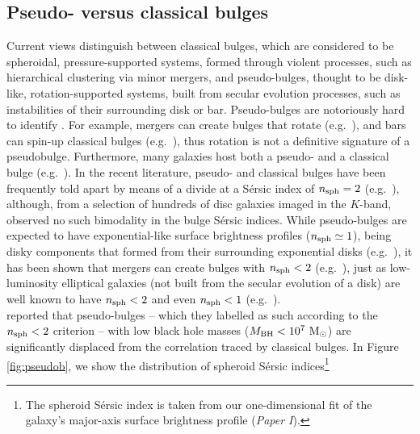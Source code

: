 \documentclass[preprint2]{emulateapj}
\begin{document}
\subsection{Pseudo- versus classical bulges}
Current views distinguish between classical bulges, which are considered to be spheroidal, pressure-supported systems, 
formed through violent processes, such as hierarchical clustering via minor mergers, 
and pseudo-bulges, thought to be disk-like, rotation-supported systems, 
built from secular evolution processes, such as instabilities of their surrounding disk or bar. 
Pseudo-bulges are notoriously hard to identify \citep{graham2013review,graham2014review,graham2015pseudo,graham2015review}.
For example, mergers can create bulges that rotate (e.g.~\citealt{bekki2010,keselmannusser2012}), 
and bars can spin-up classical bulges (e.g.~\citealt{saha2012}), 
thus rotation is not a definitive signature of a pseudobulge. 
Furthermore, many galaxies host both a pseudo- and a classical bulge (e.g.~\citealt{erwin2003,erwin2015,athanassoula2005,Gadotti2009,
macarthur2009,dosanjosdasilva2013,seidel2015}). 
In the recent literature, pseudo- and classical bulges have been frequently told apart by means of a divide at a 
S\'ersic index of $n_{\rm sph}=2$ (e.g.~\citealt{sani2011,beifiori2012}), 
although, from a selection of hundreds of disc galaxies imaged in the $K$-band, 
\cite{grahamworley2008} observed no such bimodality in the bulge S\'ersic indices. 
While pseudo-bulges are expected to have exponential-like surface brightness profiles ($n_{\rm sph} \simeq 1$), 
being disky components that formed from their surrounding exponential disks 
(e.g.~\citealt{bardeen1975,hohl1975,combessanders1981,combes1990,pfennigerfriedli1991}), 
it has been shown that mergers can create bulges with $n_{\rm sph}<2$
(e.g.~\citealt{elichemoral2011,scannapieco2011,querejeta2015}), 
just as low-luminosity elliptical galaxies (not built from the secular evolution of a disk)
are well known to have $n_{\rm sph}<2$ and even $n_{\rm sph}<1$ (e.g.~\citealt{davies1988,youngcurrie1994}). \\
\cite{sani2011} reported that pseudo-bulges -- which they labelled as such according to the $n_{\rm sph}<2$ criterion -- 
with low black hole masses ($M_{\rm BH} < 10^7\rm~M_\odot$) are significantly displaced from the correlation 
traced by classical bulges. 
In Figure \ref{fig:pseudob}, we show the distribution of spheroid S\'ersic indices\footnote{The spheroid S\'ersic index 
is taken from our one-dimensional fit of the galaxy's major-axis surface brightness profile (\emph{Paper I}).} 
\end{document}
